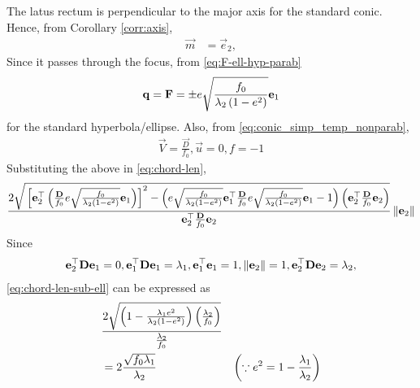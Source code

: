 \documentclass[journal,12pt,onecolumn]{IEEEtran}
\renewcommand\thesection{\arabic{section}}
\begin{document}
\begin{enumerate}[label=\thesection.\arabic*.,ref=\thesection.\theenumi]
		\section{}
		\label{app:latus}
			The latus rectum is perpendicular to the major axis for the standard conic.  Hence, from Corollary  
		\eqref{corr:axis},
  \begin{align}
  \vec{m}&= \vec{e}_2,  
\end{align}  
Since it passes through the focus, from 
					\eqref{eq:F-ell-hyp-parab}
  \begin{align}
	  \mathbf{q} =			\mathbf{F} 
=
					 \pm e\sqrt{\frac{f_0}{\lambda_2\left(1-e^2\right)}} \mathbf{e }_1
\end{align}  
for the standard hyperbola/ellipse.  Also, 
from 
    \eqref{eq:conic_simp_temp_nonparab},
  \begin{align}
	  \vec{V} =     \frac{\vec{D} }{f_0}, 
	   \vec{u} = 0, 
	   f = -1
	    \label{eq:latus_rectum_ellipse_param-new}
\end{align}  
Substituting the above in
\eqref{eq:chord-len}, 
\begin{align}
 \frac{2\sqrt{
{}\left[
\mathbf{e}_2^{\top}\left(\frac{\mathbf{D}}{f_0} e\sqrt{\frac{f_0}{\lambda_2\left(1-e^2\right)}} \mathbf{e }_1\right)
\right]^2
-
\left(
 e\sqrt{\frac{f_0}{\lambda_2\left(1-e^2\right)}} \mathbf{e }_1^{\top}\frac{\mathbf{D}}{f_0} e\sqrt{\frac{f_0}{\lambda_2\left(1-e^2\right)}} \mathbf{e }_1 -1 
\right)
\left(\mathbf{e}_2^{\top}\frac{\mathbf{D}}{f_0}\mathbf{e}_2\right)
}
}
{
\mathbf{e}_2^{\top}\frac{\mathbf{D}}{f_0}\mathbf{e}_2
}\left\lVert\mathbf{e}_2\right\rVert
\label{eq:chord-len-sub-ell}
  \end{align}
  Since 
  \begin{align}
\mathbf{e}_2^{\top}\mathbf{D}\mathbf{e}_1 = 0, 
\mathbf{e}_1^{\top}\mathbf{D}\mathbf{e}_1 = \lambda_1,
\mathbf{e}_1^{\top}\mathbf{e}_1 = 1,
	  \left\lVert\mathbf{e}_2\right\rVert = 1,
\mathbf{e}_2^{\top}\mathbf{D}\mathbf{e}_2 = \lambda_2,
  \end{align}
\eqref{eq:chord-len-sub-ell} can be expressed as 
  \begin{align}
	&		\frac{2\sqrt{\left(1-\frac{\lambda_1e^2}{{\lambda_2\left(1-e^2\right)}}\right)\left(\frac{\lambda_2}{f_0}\right)}}
{
	\frac{\lambda_2}{f_0}
	} 	
	\\
	&=		2\frac{\sqrt{
		f_0\lambda_1}}{\lambda_2}
 & \left( \because e^2 = 1-\frac{\lambda_1}{\lambda_2}\right)
		   \end{align}

\end{enumerate}
\end{document}
